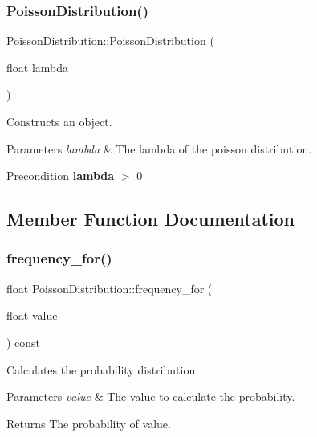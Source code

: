 \subsubsection{\texorpdfstring{Poisson\+Distribution()}{PoissonDistribution()}}
{\footnotesize\ttfamily Poisson\+Distribution\+::\+Poisson\+Distribution (\begin{DoxyParamCaption}\item[{float}]{lambda }\end{DoxyParamCaption})\hspace{0.3cm}{\ttfamily [inline]}}

Constructs an object. 
\begin{DoxyParams}{Parameters}
{\em lambda} & The lambda of the poisson distribution. \\
\hline
\end{DoxyParams}
\begin{DoxyPrecond}{Precondition}
{\bfseries lambda} $>$ 0 
\end{DoxyPrecond}


\subsection{Member Function Documentation}
\mbox{\label{classPoissonDistribution_a48783969aa40f3d9549a9db51ca1c97a}} 
\subsubsection{\texorpdfstring{frequency\+\_\+for()}{frequency\_for()}}
{\footnotesize\ttfamily float Poisson\+Distribution\+::frequency\+\_\+for (\begin{DoxyParamCaption}\item[{float}]{value }\end{DoxyParamCaption}) const\hspace{0.3cm}{\ttfamily [virtual]}}

Calculates the probability distribution. 
\begin{DoxyParams}{Parameters}
{\em value} & The value to calculate the probability. \\
\hline
\end{DoxyParams}
\begin{DoxyReturn}{Returns}
The probability of value. 
\end{DoxyReturn}


